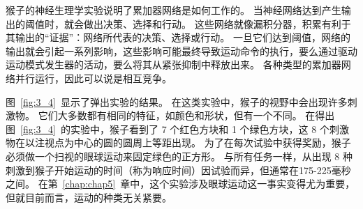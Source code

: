 猴子的神经生理学实验说明了累加器网络是如何工作的。
当神经网络达到产生输出的阈值时，就会做出决策、选择和行动。
这些网络就像漏积分器，积累有利于其输出的“证据”：网络所代表的决策、选择或行动。
一旦它们达到阈值，网络的输出就会引起一系列影响，这些影响可能最终导致运动命令的执行，要么通过驱动运动模式发生器的活动，要么将其从紧张抑制中释放出来。
各种类型的累加器网络并行运行，因此可以说是相互竞争。\par


图~\ref{fig:3_4}~显示了弹出实验的结果。
在这类实验中，猴子的视野中会出现许多刺激物。
它们大多数都有相同的特征，如颜色和形状，但有一个不同。
在得出图~\ref{fig:3_4}~的实验中，猴子看到了 7 个红色方块和 1 个绿色方块，这 8 个刺激物在以注视点为中心的圆的圆周上等距出现。
为了在每次试验中获得奖励，猴子必须做一个扫视的眼球运动来固定绿色的正方形。
与所有任务一样，从出现 8 种刺激到猴子开始运动的时间（称为响应时间）因试验而异，但通常在175-225毫秒之间。
在第~\ref{chap:chap5}~章中，这个实验涉及眼球运动这一事实变得尤为重要，但就目前而言，运动的种类无关紧要。\par


